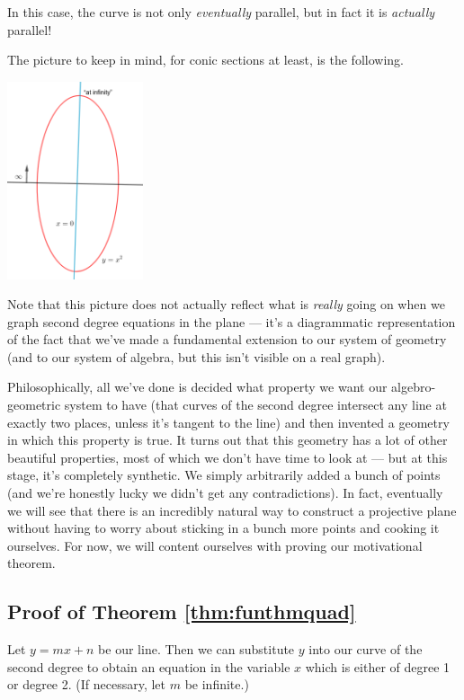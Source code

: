 \documentclass[a4paper,leqno]{article}
\numberwithin{equation}{section}
\theoremstyle{definition}
\theoremstyle{remark}
\begin{document}
In this case, the curve is not only \emph{eventually} parallel, but in fact it is \emph{actually} parallel!

The picture to keep in mind, for conic sections at least, is the following.

\begin{center}
  \includegraphics[width=0.3\textwidth]{infiniteparabola}
\end{center}

Note that this picture does not actually reflect what is \emph{really} going on when we graph second degree
equations in the plane --- it's a diagrammatic representation of the fact that we've made a fundamental extension
to our system of geometry (and to our system of algebra, but this isn't visible on a real graph).

Philosophically, all we've done is decided what property we want our algebro-geometric system to have (that
curves of the second degree intersect any line at exactly two places, unless it's tangent to the line) and then
invented a geometry in which this property is true. It turns out that this geometry has a lot of other beautiful
properties, most of which we don't have time to look at --- but at this stage, it's completely synthetic. We simply
arbitrarily added a bunch of points (and we're honestly lucky we didn't get any contradictions). In fact, eventually
we will see that there is an incredibly natural way to construct a projective plane without having to worry about
sticking in a bunch more points and cooking it ourselves. For now, we will content ourselves with proving
our motivational theorem.

\subsection{Proof of Theorem \ref{thm:funthmquad}}

Let $ y = mx + n $ be our line. Then we can substitute $ y $ into our curve of the second degree to obtain an equation
in the variable $ x $ which is either of degree 1 or degree 2. (If necessary, let $ m $ be infinite.)
\end{document}
